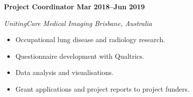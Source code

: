\textbf{Project Coordinator \hfill Mar 2018--Jun 2019}\par
\textit{UnitingCare Medical Imaging \hfill Brisbane, Australia}\par
\begin{itemize}
    \item Occupational lung disease and radiology research.
	\item Questionnaire development with Qualtrics.
	\item Data analysis and visualisations.
    \item Grant applications and project reports to project funders.
\end{itemize}\par

